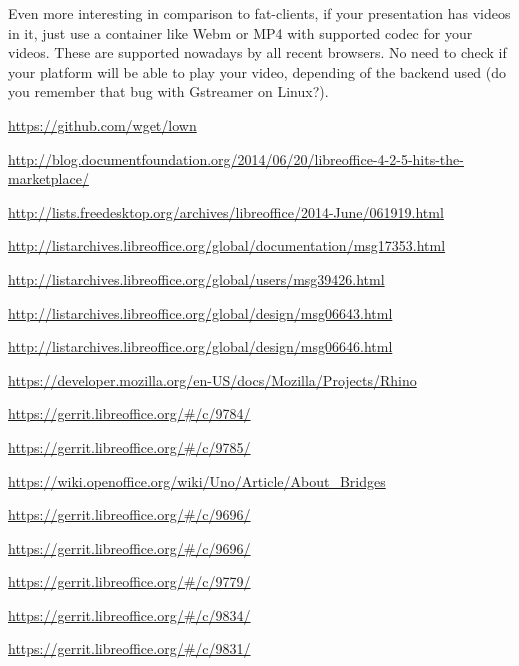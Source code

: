 \documentclass{article}
\begin{document}
Even more interesting in comparison to fat-clients, if your presentation has videos in it, just use a container like Webm or MP4 with supported codec for your videos. These are supported nowadays by all recent browsers. No need to check if your platform will be able to play your video, depending of the backend used (do you remember that bug with Gstreamer on Linux?\cite{impressVideoBug,impressVideoBug2}).



\begin{thebibliography}{30}



\url{https://github.com/wget/lown}

    \url{http://blog.documentfoundation.org/2014/06/20/libreoffice-4-2-5-hits-the-marketplace/}

    \url{http://lists.freedesktop.org/archives/libreoffice/2014-June/061919.html}

    \url{http://listarchives.libreoffice.org/global/documentation/msg17353.html}

    \url{http://listarchives.libreoffice.org/global/users/msg39426.html}

    \url{http://listarchives.libreoffice.org/global/design/msg06643.html}

    \url{http://listarchives.libreoffice.org/global/design/msg06646.html}

    \url{https://developer.mozilla.org/en-US/docs/Mozilla/Projects/Rhino}

    \url{https://gerrit.libreoffice.org/#/c/9784/}

    \url{https://gerrit.libreoffice.org/#/c/9785/}

    \url{https://wiki.openoffice.org/wiki/Uno/Article/About_Bridges}

    \url{https://gerrit.libreoffice.org/#/c/9696/}

    \url{https://gerrit.libreoffice.org/#/c/9696/}

    \url{https://gerrit.libreoffice.org/#/c/9779/}

    \url{https://gerrit.libreoffice.org/#/c/9834/}

    \url{https://gerrit.libreoffice.org/#/c/9831/}


\end{thebibliography}
\end{document}
